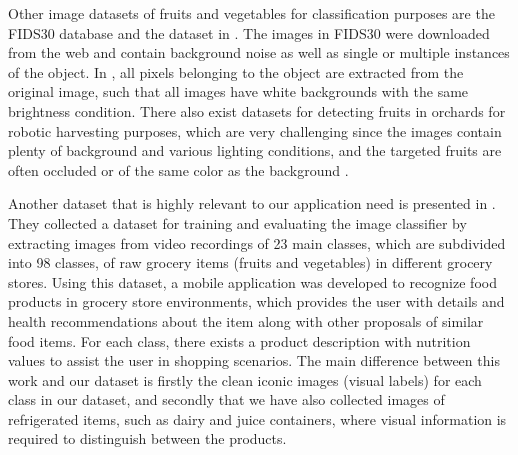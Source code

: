 Other image datasets of fruits and vegetables for classification purposes are the FIDS30 database  and the dataset in . The images in FIDS30 were downloaded from the web and contain background noise as well as single or multiple instances of the object. In , all pixels belonging to the object are extracted from the original image, such that all images have white backgrounds with the same brightness condition. There also exist datasets for detecting fruits in orchards for robotic harvesting purposes, which are very challenging since the images contain plenty of background and various lighting conditions, and the targeted fruits are often occluded or of the same color as the background .

Another dataset that is highly relevant to our application need is presented in  . They collected a dataset for training and evaluating the image classifier by extracting images from video recordings of 23 main classes, which are subdivided into 98 classes, of raw grocery items (fruits and vegetables) in different grocery stores. Using this dataset, a mobile application was developed to recognize food products in grocery store environments, which provides the user with details and health recommendations about the item along with other proposals of similar food items. For each class, there exists a product description with nutrition values to assist the user in shopping scenarios. The main difference between this work and our dataset is firstly the clean iconic images (visual labels) for each class in our dataset, and secondly that we have also collected images of refrigerated items, such as dairy and juice containers, where visual information is required to distinguish between the products.   
